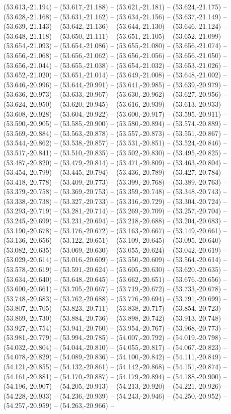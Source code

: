 (53.613,-21.194) -- (53.617,-21.188) -- (53.621,-21.181) -- (53.624,-21.175) -- (53.628,-21.168) -- (53.631,-21.162) -- (53.634,-21.156) -- (53.637,-21.149) -- (53.639,-21.143) -- (53.642,-21.136) -- (53.644,-21.130) -- (53.646,-21.124) -- (53.648,-21.118) -- (53.650,-21.111) -- (53.651,-21.105) -- (53.652,-21.099) -- (53.654,-21.093) -- (53.654,-21.086) -- (53.655,-21.080) -- (53.656,-21.074) -- (53.656,-21.068) -- (53.656,-21.062) -- (53.656,-21.056) -- (53.656,-21.050) -- (53.656,-21.044) -- (53.655,-21.038) -- (53.654,-21.032) -- (53.653,-21.026) -- (53.652,-21.020) -- (53.651,-21.014) -- (53.649,-21.008) -- (53.648,-21.002) -- (53.646,-20.996) -- (53.644,-20.991) -- (53.641,-20.985) -- (53.639,-20.979) -- (53.636,-20.973) -- (53.633,-20.967) -- (53.630,-20.962) -- (53.627,-20.956) -- (53.624,-20.950) -- (53.620,-20.945) -- (53.616,-20.939) -- (53.613,-20.933) -- (53.608,-20.928) -- (53.604,-20.922) -- (53.600,-20.917) -- (53.595,-20.911) -- (53.590,-20.905) -- (53.585,-20.900) -- (53.580,-20.894) -- (53.574,-20.889) -- (53.569,-20.884) -- (53.563,-20.878) -- (53.557,-20.873) -- (53.551,-20.867) -- (53.544,-20.862) -- (53.538,-20.857) -- (53.531,-20.851) -- (53.524,-20.846) -- (53.517,-20.841) -- (53.510,-20.835) -- (53.502,-20.830) -- (53.495,-20.825) -- (53.487,-20.820) -- (53.479,-20.814) -- (53.471,-20.809) -- (53.463,-20.804) -- (53.454,-20.799) -- (53.445,-20.794) -- (53.436,-20.789) -- (53.427,-20.784) -- (53.418,-20.778) -- (53.409,-20.773) -- (53.399,-20.768) -- (53.389,-20.763) -- (53.379,-20.758) -- (53.369,-20.753) -- (53.359,-20.748) -- (53.348,-20.743) -- (53.338,-20.738) -- (53.327,-20.733) -- (53.316,-20.729) -- (53.304,-20.724) -- (53.293,-20.719) -- (53.281,-20.714) -- (53.269,-20.709) -- (53.257,-20.704) -- (53.245,-20.699) -- (53.231,-20.694) -- (53.218,-20.688) -- (53.204,-20.683) -- (53.190,-20.678) -- (53.176,-20.672) -- (53.163,-20.667) -- (53.149,-20.661) -- (53.136,-20.656) -- (53.122,-20.651) -- (53.109,-20.645) -- (53.095,-20.640) -- (53.082,-20.635) -- (53.069,-20.630) -- (53.055,-20.624) -- (53.042,-20.619) -- (53.029,-20.614) -- (53.016,-20.609) -- (53.550,-20.609) -- (53.564,-20.614) -- (53.578,-20.619) -- (53.591,-20.624) -- (53.605,-20.630) -- (53.620,-20.635) -- (53.634,-20.640) -- (53.648,-20.645) -- (53.662,-20.651) -- (53.676,-20.656) -- (53.690,-20.661) -- (53.705,-20.667) -- (53.719,-20.672) -- (53.733,-20.678) -- (53.748,-20.683) -- (53.762,-20.688) -- (53.776,-20.694) -- (53.791,-20.699) -- (53.807,-20.705) -- (53.823,-20.711) -- (53.838,-20.717) -- (53.854,-20.723) -- (53.869,-20.730) -- (53.884,-20.736) -- (53.898,-20.742) -- (53.913,-20.748) -- (53.927,-20.754) -- (53.941,-20.760) -- (53.954,-20.767) -- (53.968,-20.773) -- (53.981,-20.779) -- (53.994,-20.785) -- (54.007,-20.792) -- (54.019,-20.798) -- (54.032,-20.804) -- (54.044,-20.810) -- (54.055,-20.817) -- (54.067,-20.823) -- (54.078,-20.829) -- (54.089,-20.836) -- (54.100,-20.842) -- (54.111,-20.849) -- (54.121,-20.855) -- (54.132,-20.861) -- (54.142,-20.868) -- (54.151,-20.874) -- (54.161,-20.881) -- (54.170,-20.887) -- (54.179,-20.894) -- (54.188,-20.900) -- (54.196,-20.907) -- (54.205,-20.913) -- (54.213,-20.920) -- (54.221,-20.926) -- (54.228,-20.933) -- (54.236,-20.939) -- (54.243,-20.946) -- (54.250,-20.952) -- (54.257,-20.959) -- (54.263,-20.966) -- 